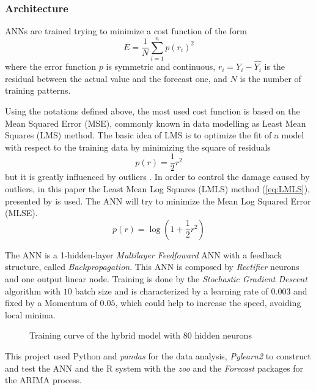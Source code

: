 \documentclass{sig-alternate-sigmod07}
\begin{document}
\subsubsection{Architecture}

ANNs are trained trying to minimize a cost function of the form
\begin{displaymath}E= \frac{1}{N}\sum_{i=1}^np(r_i)^2\end{displaymath}
where the error function $p$ is symmetric and continuous, $r_i = Y_i - \hat{Y_i}$ is the residual between the actual value and the forecast one, and $N$ is the number of training patterns.

Using the notations defined above, the most used cost function is based on the Mean Squared Error (MSE), commonly known in data modelling as Least Mean Squares (LMS) method. The basic idea of LMS is to optimize the fit of a model with respect to the training data by minimizing the square of residuals
\begin{displaymath}p(r)= \frac{1}{2}r^2\end{displaymath}
but it is greatly influenced by outliers \cite{liano1996robust}. In order to control the damage caused by outliers, in this paper the Least Mean Log Squares (LMLS) method  (\cref{eq:LMLS}), presented by \cite{liano1996robust} is used. The ANN will try to minimize the Mean Log Squared Error (MLSE). 
\begin{equation}
p(r) = \log(1 + \frac{1}{2}r^2)
\label{eq:LMLS}
\end{equation}

The ANN is a 1-hidden-layer \emph{Multilayer Feedfoward} ANN with a feedback structure, called \textit{Backpropagation}. This ANN is composed by \emph{Rectifier} neurons and one output linear node. Training is done by the \emph{Stochastic Gradient Descent} algorithm with $10$ batch size and is characterized by a learning rate of $0.003$ and fixed by a Momentum of $0.05$, which could help to increase the speed, avoiding local minima.

\begin{figure}
\centering
{}
\caption{Training curve of the hybrid model with 80 hidden neurons}
\end{figure}

This project used Python and \emph{pandas} for the data analysis, \emph{Pylearn2} \cite{goodfellow2013pylearn2} to construct and test the ANN and the R system with the \emph{zoo} \cite{zeileis2005zoo} and the \emph{Forecast} \cite{hyndman2007automatic} packages for the ARIMA process. 
\end{document}
